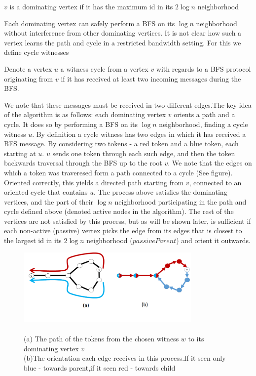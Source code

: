 \begin{definition}
	$v$ is a dominating vertex if it has the maximum id in its $2\log{n}$ neighborhood
\end{definition}
Each dominating vertex can safely perform a BFS on its $\log{n}$ neighborhood without interference from other dominating vertices. It is not clear how such a vertex learns the path and cycle in a restricted bandwidth setting. For this we define cycle witnesses
\begin{definition}
	Denote a vertex $u$ a witness cycle from a vertex $v$ with regards to a BFS protocol originating from $v$ if it has received at least two incoming messages during the BFS.
\end{definition}
We note that these messages must be received in two different edges.The key idea of the algorithm is as follows: each dominating vertex $v$ orients a path and a cycle. It does so by performing a BFS on its $\log{n}$ neighborhood, finding a cycle witness $u$. By definition a cycle witness has two edges in which it has received a BFS message. By considering two tokens - a red token and a blue token, each starting at $u$. $u$ sends one token through each such edge, and then the token backwards traversal through the BFS up to the root $v$. We note that the edges on which a token was traveresed form a path connected to a cycle (See figure). Oriented correctly, this yields a directed path starting from $v$, connected to an oriented cycle that contains $u$. The process above satisfies the dominating vertices, and the part of their $\log{n}$ neighborhood participating in the path and cycle defined above (denoted active nodes in the algorithm). The rest of the vertices are not satisfied by this process, but as will be shown later, is sufficient if each non-active (passive) vertex picks the edge from its edges that is closest to the largest id in its $2\log{n}$ neighborhood ($passiveParent$) and orient it outwards.

\begin{figure}[h]
	\centering
	\includegraphics[width=0.8\textwidth]{img/CongestFigure.png}
	\caption{\\(a) The path of the tokens from the chosen witness $w$ to its dominating vertex $v$ \\(b)The orientation each edge receives in this process.If it seen only blue - towards parent,if it seen red - towards child}
\end{figure}



